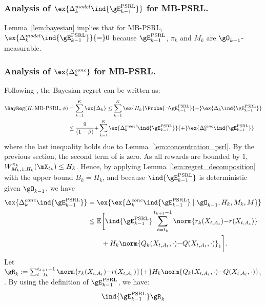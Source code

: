 \begin{subappendices}
\subsubsection{Analysis of $\ex{\Delta^{model}_k \ind{\gE_{k-1}^\text{PSRL}}}$ for MB-PSRL.}

Lemma~\ref{lem:bayesian} implies that for MB-PSRL, $\ex{\Delta^{model}_k \ind{\gE_{k-1}^\text{PSRL}}}{=}0$ because
$\gE_{k-1}^\text{PSRL}$, $\pi_k$ and $M_k$ are $\gO_{k-1}$-measurable. 

\subsubsection{Analysis of $\ex{\Delta^{conc}_k}$ for MB-PSRL.}
Following , the Bayesian regret can be written as:
\begin{align}
    \BayReg(K,\text{MB-PSRL},\phi)
    &= \sum_{k=1}^K \ex{\Delta_k} \le \sum_{k=1}^{K}\ex{H_k}\Proba{\neg \gE^\text{PSRL}_{k-1}} {+}\ex{\Delta_k \ind{\gE^\text{PSRL}_{k-1}}} \nonumber \\
    &\le \frac{9}{(1-\beta)} {+} \sum_{k=1}^{K} \ex{\Delta^{model}_k\ind{\gE^\text{PSRL}_{k-1}}} {+} \ex{\Delta^{conc}_k\ind{\gE^\text{PSRL}_{k-1}}}
    \label{eq:proof_PSRL_regret}
\end{align}
where the last inequality holds due to Lemma~\ref{lem:concentration_psrl}.
By the previous section, the second term of  is zero.
As all rewards are bounded by $1$, $W_{M_k,1:H_k}^{\pi_k}(\mX_{t_k})\le H_k$. Hence, by applying Lemma~\ref{lem:regret_decomposition} with the upper bound $B_k=H_k$, and because $\ind{\gE_{k-1}^\text{PSRL}}$ is deterministic given $\gO_{k-1}$, we have
\begin{align}
    \ex{\Delta_k^{conc} \ind{\gE_{k-1}^\text{PSRL}}}
    &= \ex{\ex{\Delta_k^{conc} \ind{\gE_{k-1}^\text{PSRL}} \mid \gO_{k-1}, H_k, M_k, M}} \nonumber \\
    &\le \mathbb{E}\bigg[ \ind{\gE_{k-1}^\text{PSRL}} \sum_{t=t_k}^{t_{k+1}-1}\norm{r_k(X_{t,A_t}){-}r(X_{t,A_t})} \nonumber\\
    &\qquad +H_k\norm{Q_{k}(X_{t,A_t},\cdot){-}Q(X_{t,A_t},\cdot)}_1 \bigg]. \label{eq:conc_with_i}
\end{align}
Let $\gR_k := \sum_{t=t_k}^{t_{k+1}-1}\norm{r_k(X_{t,A_t}){-}r(X_{t,A_t})} {+}H_k\norm{Q_{k}(X_{t,A_t},\cdot){-}Q(X_{t,A_t},\cdot)}_1$. 
By using the definition of $\gE_{k-1}^\text{PSRL}$, we have:
\begin{align}
    \ind{\gE_{k-1}^\text{PSRL}}\gR_k 

\end{align}
\end{subappendices}
